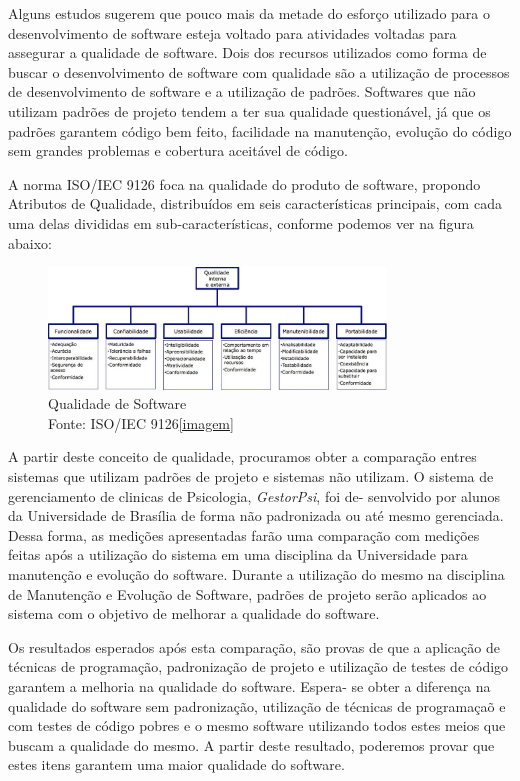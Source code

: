 
Alguns estudos sugerem que pouco mais da metade do esforço utilizado para o desenvolvimento de software
esteja voltado para atividades voltadas para assegurar a qualidade de software. Dois dos recursos utilizados como
forma de buscar o desenvolvimento de software com qualidade são a utilização de processos de desenvolvimento
de software e a utilização de padrões. Softwares que não utilizam padrões de projeto tendem a ter sua qualidade
questionável, já que os padrões garantem código bem feito, facilidade na manutenção, evolução do código sem
grandes problemas e cobertura aceitável de código.

A norma ISO/IEC 9126 foca na qualidade do produto de software, propondo Atributos de Qualidade,
distribuídos em seis características principais, com cada uma delas divididas em sub-características, conforme
podemos ver na figura abaixo:
\begin{figure}[h]
	\centering
	\includegraphics[width=0.8\textwidth]{conteudo/qualidade}
	\caption{Qualidade de Software\\Fonte: ISO/IEC 9126\cref{imagem}}
\end{figure}

A partir deste conceito de qualidade, procuramos obter a comparação entres sistemas que utilizam padrões
de projeto e sistemas não utilizam. O sistema de gerenciamento de clinicas de Psicologia, \textit{GestorPsi}, foi de-
senvolvido por alunos da Universidade de Brasília de forma não padronizada ou até mesmo gerenciada. Dessa
forma, as medições apresentadas farão uma comparação com medições feitas após a utilização do sistema em
uma disciplina da Universidade para manutenção e evolução do software. Durante a utilização do mesmo na
disciplina de Manutenção e Evolução de Software, padrões de projeto serão aplicados ao sistema com o objetivo
de melhorar a qualidade do software.

Os resultados esperados após esta comparação, são provas de que a aplicação de técnicas de programação,
padronização de projeto e utilização de testes de código garantem a melhoria na qualidade do software. Espera-
se obter a diferença na qualidade do software sem padronização, utilização de técnicas de programaçaõ e com
testes de código pobres e o mesmo software utilizando todos estes meios que buscam a qualidade do mesmo. A
partir deste resultado, poderemos provar que estes itens garantem uma maior qualidade do software.

